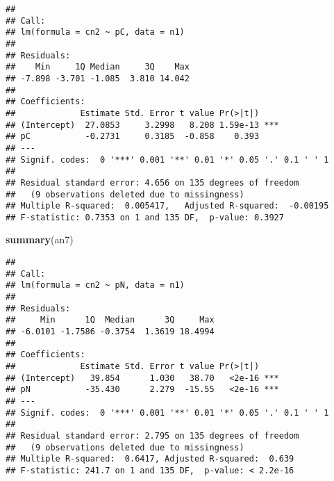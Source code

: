 \documentclass[]{article}
\newenvironment{Shaded}{\begin{snugshade}}{\end{snugshade}}
\newcommand{\KeywordTok}[1]{\textcolor[rgb]{0.13,0.29,0.53}{\textbf{#1}}}
\newcommand{\DataTypeTok}[1]{\textcolor[rgb]{0.13,0.29,0.53}{#1}}
\newcommand{\DecValTok}[1]{\textcolor[rgb]{0.00,0.00,0.81}{#1}}
\newcommand{\StringTok}[1]{\textcolor[rgb]{0.31,0.60,0.02}{#1}}
\newcommand{\OperatorTok}[1]{\textcolor[rgb]{0.81,0.36,0.00}{\textbf{#1}}}
\newcommand{\NormalTok}[1]{#1}
\begin{document}
\begin{verbatim}
## 
## Call:
## lm(formula = cn2 ~ pC, data = n1)
## 
## Residuals:
##    Min     1Q Median     3Q    Max 
## -7.898 -3.701 -1.085  3.810 14.042 
## 
## Coefficients:
##             Estimate Std. Error t value Pr(>|t|)    
## (Intercept)  27.0853     3.2998   8.208 1.59e-13 ***
## pC           -0.2731     0.3185  -0.858    0.393    
## ---
## Signif. codes:  0 '***' 0.001 '**' 0.01 '*' 0.05 '.' 0.1 ' ' 1
## 
## Residual standard error: 4.656 on 135 degrees of freedom
##   (9 observations deleted due to missingness)
## Multiple R-squared:  0.005417,   Adjusted R-squared:  -0.00195 
## F-statistic: 0.7353 on 1 and 135 DF,  p-value: 0.3927
\end{verbatim}

\begin{Shaded}
\begin{Highlighting}[]
\KeywordTok{summary}\NormalTok{(an7)}
\end{Highlighting}
\end{Shaded}

\begin{verbatim}
## 
## Call:
## lm(formula = cn2 ~ pN, data = n1)
## 
## Residuals:
##     Min      1Q  Median      3Q     Max 
## -6.0101 -1.7586 -0.3754  1.3619 18.4994 
## 
## Coefficients:
##             Estimate Std. Error t value Pr(>|t|)    
## (Intercept)   39.854      1.030   38.70   <2e-16 ***
## pN           -35.430      2.279  -15.55   <2e-16 ***
## ---
## Signif. codes:  0 '***' 0.001 '**' 0.01 '*' 0.05 '.' 0.1 ' ' 1
## 
## Residual standard error: 2.795 on 135 degrees of freedom
##   (9 observations deleted due to missingness)
## Multiple R-squared:  0.6417, Adjusted R-squared:  0.639 
## F-statistic: 241.7 on 1 and 135 DF,  p-value: < 2.2e-16
\end{verbatim}

\begin{Shaded}
\end{Shaded}
\end{document}
